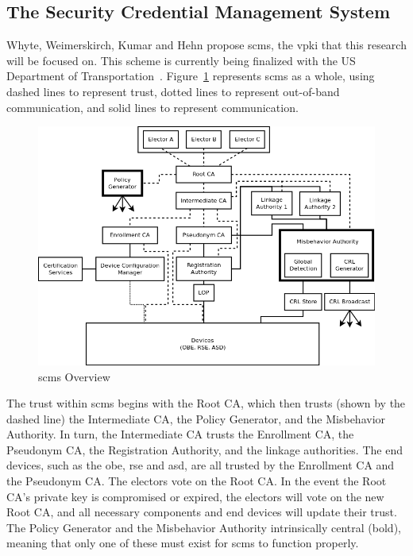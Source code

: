 \documentclass {article}
\begin{document}
\subsection{The Security Credential Management System}
Whyte, Weimerskirch, Kumar and Hehn propose \gls{scms}, the \gls{vpki} that this research will be focused on. This scheme is currently being finalized with the US Department of Transportation~\autocite{brecht_security_2018}. Figure~\ref{scms_overview} represents \gls{scms} as a whole, using dashed lines to represent trust, dotted lines to represent out-of-band communication, and solid lines to represent communication. 
\begin{figure}[!ht]
	\centering
	\includegraphics[width=.8\textwidth]{images/scms_diagram.png}
	\caption{\gls{scms} Overview}
	\label{scms_overview}
\end{figure}
The trust within \gls{scms} begins with the Root CA, which then trusts (shown by the dashed line) the Intermediate CA, the Policy Generator, and the Misbehavior Authority. In turn, the Intermediate CA trusts the Enrollment CA, the Pseudonym CA, the Registration Authority, and the linkage authorities. The end devices, such as the \gls{obe}, \gls{rse} and \gls{asd}, are all trusted by the Enrollment CA and the Pseudonym CA. The electors vote on the Root CA. In the event the Root CA's private key is compromised or expired, the electors will vote on the new Root CA, and all necessary components and end devices will update their trust. The Policy Generator and the Misbehavior Authority intrinsically central (bold), meaning that only one of these must exist for \gls{scms} to function properly.
\end{document}
